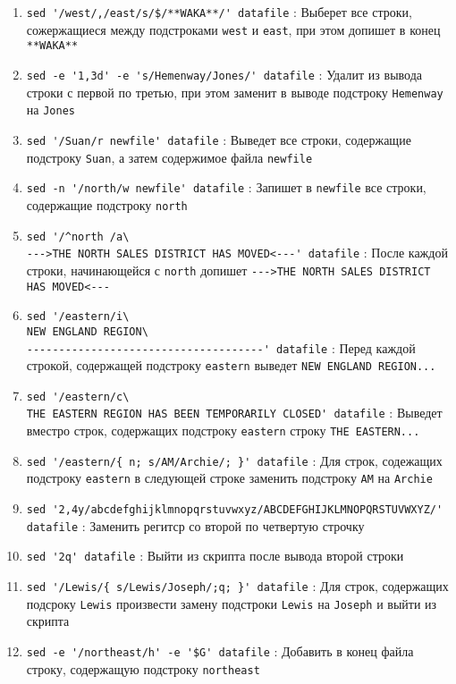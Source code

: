 \documentclass[12pt, a4paper]{article}
\begin{document}
\begin{enumerate}
  \item \verb|sed '/west/,/east/s/$/**WAKA**/' datafile| : Выберет все строки,
    сожержащиеся между подстроками \verb|west| и \verb|east|, при этом допишет
    в конец \verb|**WAKA**|
  \item \verb|sed -e '1,3d' -e 's/Hemenway/Jones/' datafile| : Удалит из вывода
    строки с первой по третью, при этом заменит в выводе подстроку \verb|Hemenway|
    на \verb|Jones|
  \item \verb|sed '/Suan/r newfile' datafile| : Выведет все строки, содержащие
    подстроку \verb|Suan|, а затем содержимое файла \verb|newfile|
  \item \verb|sed -n '/north/w newfile' datafile| : Запишет в \verb|newfile|
    все строки, содержащие подстроку \verb|north|
  \item \verb=sed '/^north /a\=\\
    \verb=--->THE NORTH SALES DISTRICT HAS MOVED<---' datafile=
    : После каждой
    строки, начинающейся с \verb|north| допишет \verb|--->THE NORTH SALES DISTRICT HAS MOVED<---|
  \item \verb|sed '/eastern/i\|\\
    \verb|NEW ENGLAND REGION\|\\
    \verb|-------------------------------------' datafile| : Перед каждой строкой,
    содержащей подстроку \verb|eastern| выведет \verb|NEW ENGLAND REGION...|
  \item \verb|sed '/eastern/c\|\\
    \verb|THE EASTERN REGION HAS BEEN TEMPORARILY CLOSED' datafile| : Выведет
    вместро строк, содержащих подстроку \verb|eastern| строку \verb|THE EASTERN...|
  \item \verb|sed '/eastern/{ n; s/AM/Archie/; }' datafile| : Для строк, содежащих
    подстроку \verb|eastern| в следующей строке заменить подстроку \verb|AM|
    на \verb|Archie|
  \item \verb|sed '2,4y/abcdefghijklmnopqrstuvwxyz/ABCDEFGHIJKLMNOPQRSTUVWXYZ/' datafile|
    : Заменить регитср со второй по четвертую строчку
  \item \verb|sed '2q' datafile| : Выйти из скрипта после вывода второй строки
  \item \verb|sed '/Lewis/{ s/Lewis/Joseph/;q; }' datafile| : Для строк, содержащих
    подсроку \verb|Lewis| произвести замену подстроки \verb|Lewis| на \verb|Joseph|
    и выйти из скрипта
  \item \verb|sed -e '/northeast/h' -e '$G' datafile| : Добавить в конец файла
    строку, содержащую подстроку \verb|northeast|

\end{enumerate}
\end{document}
